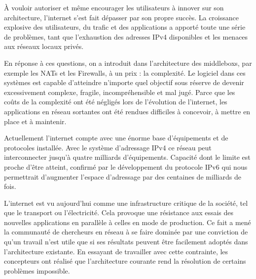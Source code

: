 À vouloir autoriser et même encourager les utilisateurs à innover sur son architecture, l'internet s'est fait dépasser par son propre succès. La croissance explosive des utilisateurs, du trafic et des applications a apporté toute une série de problèmes, 
tant que l'exhaustion des adresses IPv4 disponibles et les menaces aux réseaux locaux privés. 

\par
En réponse à ces questions, on a introduit dans l'architecture des \glspl{middlebox}, par exemple les NATs et les Firewalls, à un prix : la complexité. Le logiciel dans ces systèmes est capable d'atteindre n'importe quel objectif sous réserve de devenir excessivement complexe, fragile, incompréhensible et mal jugé. Parce que les coûts de la complexité ont été négligés lors de l'évolution de l'internet, les applications en réseau sortantes ont été rendues difficiles à concevoir, à mettre en place et à maintenir. \cite{InternetEvolutionRoleSoftwareEngineeringRealInternet}

Actuellement l'internet compte avec une énorme base d'équipements et de protocoles installée. Avec le système d'adressage IPv4 ce réseau peut interconnecter jusqu'à quatre milliards d'équipements. Capacité dont le limite est proche d'être atteint, confirmé par le développement du protocole IPv6 qui nous permettrait d'augmenter l'espace d'adressage par des centaines de milliards de fois. \cite{ICANNIPv6Important} 

L'internet est vu aujourd'hui comme une infrastructure critique de la société, tel que le transport ou l'électricité.  Cela provoque une résistance aux essais des nouvelles applications en parallèle à celles en mode de production. 
Ce fait a mené la communauté de chercheurs en réseau à se faire dominée par une conviction de qu'un travail n'est utile que si ses résultats peuvent être facilement adoptés dans l'architecture existante. En essayant de travailler avec cette contrainte, les concepteurs ont réalisé que l'architecture courante rend la résolution de certains problèmes impossible. \cite{OpenFlowStanfordOssification} \cite{SurveySDNIntro}

